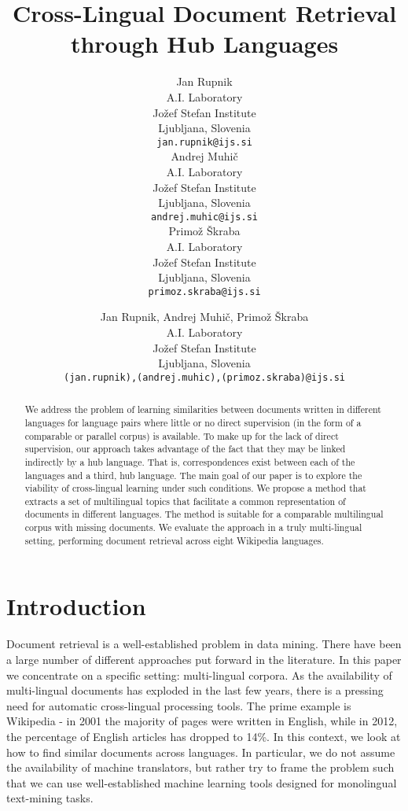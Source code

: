 \documentclass{article} %
\title{Cross-Lingual Document Retrieval through Hub Languages}
\author{
Jan Rupnik \\
A.I. Laboratory\\
Jo\v zef Stefan Institute\\
Ljubljana, Slovenia\\
\texttt{jan.rupnik@ijs.si} \\
\And
Andrej Muhi\v c\\
A.I. Laboratory\\
Jo\v zef Stefan Institute\\
Ljubljana, Slovenia\\
\texttt{andrej.muhic@ijs.si} \\
\AND
Primo\v z \v Skraba \\
A.I. Laboratory\\
Jo\v zef Stefan Institute\\
Ljubljana, Slovenia\\
\texttt{primoz.skraba@ijs.si} \\
}
\author{
Jan Rupnik, Andrej Muhi\v c, Primo\v z \v Skraba \\
A.I. Laboratory\\
Jo\v zef Stefan Institute\\
Ljubljana, Slovenia\\
\texttt{(jan.rupnik),(andrej.muhic),(primoz.skraba)@ijs.si} \\
}
\begin{document}
\maketitle

\begin{abstract}
We address the problem of learning similarities between documents written in different languages for language pairs where little or no direct supervision (in the form of a comparable or parallel corpus) is available. To make up for the lack of direct supervision, our approach takes advantage of the fact that they may be linked indirectly by a hub language. That is, correspondences exist between each of the languages and a third,  hub language.
The main goal of our paper is to explore the viability of cross-lingual learning under such conditions.
We propose a method that extracts a set of multilingual topics that facilitate a common representation of documents in different languages. The method is suitable for a comparable multilingual corpus with missing documents.  We evaluate the approach in a truly multi-lingual setting, performing document retrieval across eight Wikipedia languages.
\end{abstract}



\section{Introduction}
%


Document retrieval is a well-established problem in data
mining. There have been a large number of different approaches
put forward in the literature. In this paper we concentrate on a
specific setting: multi-lingual corpora. As the availability of
multi-lingual documents has exploded in the last few years, there is a pressing
need for automatic cross-lingual processing tools.
%
The prime example is Wikipedia - in 2001 the majority of pages
were written in English, while in 2012, the percentage of English
articles has dropped to 14\%. In this context, we look at how to
find similar documents across languages. In particular, we do not
assume the availability of machine translators, but rather try to
frame the problem such that we can use well-established machine
learning tools designed for monolingual text-mining tasks.
\end{document}
